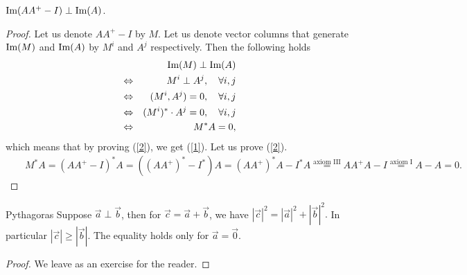     \begin{lemma}{1}{}
        $\text{Im} (AA^+-I) \perp \text{Im} (A) $.
    \end{lemma}
    \begin{proof}    
        Let us denote $ AA^+-I$ by $M$. Let us denote vector columns that generate $\text{Im}(M)$ and $\text{Im}(A)$ by $M^i$ and $A^j$ respectively. Then the following holds
        \begin{eqnarray}
            &&\text{Im}(M)  \perp \text{Im} (A) \label{1}\\
            \Leftrightarrow &&M^i \perp A^j,\quad \forall i,j\nonumber\\
            \Leftrightarrow &&(M^i, A^j)=0,\quad \forall i,j\nonumber\\
            \Leftrightarrow &&(M^i)^*\cdot A^j=0,\quad \forall i,j\nonumber\\
            \Leftrightarrow &&M^*A=0,\label{2}
        \end{eqnarray}
        which means that by proving (\ref{2}), we get (\ref{1}). Let us prove (\ref{2}).
        \begin{eqnarray}
            &&M^* A=(AA^+-I)^* A
            =((AA^+)^*-I^*)A 
            =(AA^+)^*A-I^* A
            \stackrel{\text{axiom III}}{=}AA^+A-I
            \stackrel{\text{axiom I}}{=}A-A=0\nonumber.
        \end{eqnarray}
    \end{proof}
    \begin{theorema}{Pythagoras}{}
        Suppose $\vec{a} \perp \vec{b}$, then for $\vec{c} = \vec{a} + \vec{b}$, we have $|\vec{c}|^2 = |\vec{a}|^2 + |\vec{b}|^2.$ In particular $|\vec{c}| \geq |\vec{b}|$. The equality holds only for $\vec{a} = \vec{0}$.
    \end{theorema}      
    \begin{proof}
        We leave as an exercise for the reader.
    \end{proof}
